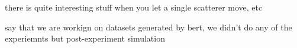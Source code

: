 there is quite interesting stuff when you let a single scatterer
move, etc

say that we are workign on datasets generated by bert, we didn't do any of
the experiemnts but post-experiment simulation
